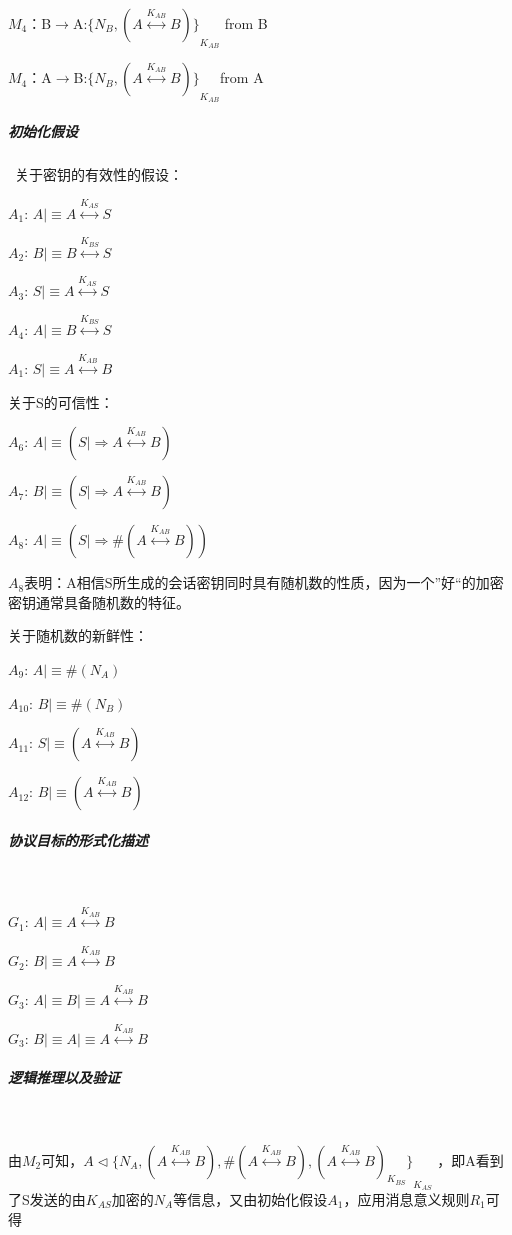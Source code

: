 \documentclass[cs4size,a4pape,UTF8]{ctexart}
\numberwithin{equation}{section}
\numberwithin{table}{section}
\numberwithin{figure}{section}
\begin{document}
$M_{4}$：B$\to$A:${\{N_{B},(A\stackrel{K_{AB}}{\longleftrightarrow}B)\}}_{K_{AB}}$ from B

$M_{4}$：A$\to$B:${\{N_{B},(A\stackrel{K_{AB}}{\longleftrightarrow}B)\}}_{K_{AB}}$from A

\subparagraph{初始化假设}\
关于密钥的有效性的假设：

$A_{1}$: $A{\lvert\equiv}A\stackrel{K_{AS}}{\longleftrightarrow}S$

$A_{2}$: $B{\lvert\equiv}B\stackrel{K_{BS}}{\longleftrightarrow}S$

$A_{3}$: $S{\lvert\equiv}A\stackrel{K_{AS}}{\longleftrightarrow}S$

$A_{4}$: $A{\lvert\equiv}B\stackrel{K_{BS}}{\longleftrightarrow}S$

$A_{1}$: $S{\lvert\equiv}A\stackrel{K_{AB}}{\longleftrightarrow}B$

关于S的可信性：

$A_{6}$: $A{\lvert\equiv}(S{\lvert\Rightarrow}A\stackrel{K_{AB}}{\longleftrightarrow}B)$

$A_{7}$: $B{\lvert\equiv}(S{\lvert\Rightarrow}A\stackrel{K_{AB}}{\longleftrightarrow}B)$

$A_{8}$: $A{\lvert\equiv}(S{\lvert\Rightarrow}\#(A\stackrel{K_{AB}}{\longleftrightarrow}B))$

$A_{8}$表明：A相信S所生成的会话密钥同时具有随机数的性质，因为一个”好“的加密密钥通常具备随机数的特征。

关于随机数的新鲜性：

$A_{9}$: $A{\lvert\equiv}\#(N_{A})$

$A_{10}$: $B{\lvert\equiv}\#(N_{B})$

$A_{11}$: $S{\lvert\equiv}(A\stackrel{K_{AB}}{\longleftrightarrow}B)$

$A_{12}$: $B{\lvert\equiv}(A\stackrel{K_{AB}}{\longleftrightarrow}B)$

\subparagraph{协议目标的形式化描述}\

$G_{1}$: $A{\lvert\equiv}A\stackrel{K_{AB}}{\longleftrightarrow}B$

$G_{2}$: $B{\lvert\equiv}A\stackrel{K_{AB}}{\longleftrightarrow}B$

$G_{3}$: $A{\lvert\equiv}B{\lvert\equiv}A\stackrel{K_{AB}}{\longleftrightarrow}B$

$G_{3}$: $B{\lvert\equiv}A{\lvert\equiv}A\stackrel{K_{AB}}{\longleftrightarrow}B$

\subparagraph{逻辑推理以及验证}\

由$M_{2}$可知，$A\triangleleft{\{N_{A},(A\stackrel{K_{AB}}{\longleftrightarrow}B),\#(A\stackrel{K_{AB}}{\longleftrightarrow}B),{(A\stackrel{K_{AB}}{\longleftrightarrow}B)}_{K_{BS}}\}}_{K_{AS}}$ ，即A看到了S发送的由$K_{AS}$加密的$N_{A}$等信息，又由初始化假设$A_{1}$，应用消息意义规则$R_{1}$可得
\end{document}
